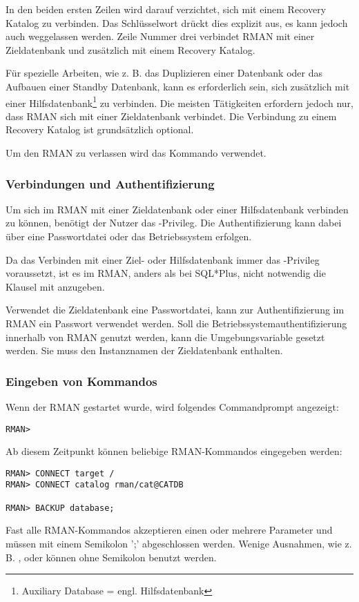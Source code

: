           In den beiden ersten Zeilen wird darauf verzichtet, sich mit einem Recovery Katalog zu verbinden. Das Schlüsselwort  drückt dies explizit aus, es kann jedoch auch weggelassen werden. Zeile Nummer drei verbindet RMAN mit einer Zieldatenbank und zusätzlich mit einem Recovery Katalog.

          Für spezielle Arbeiten, wie z. B. das Duplizieren einer Datenbank oder das Aufbauen einer Standby Datenbank, kann es erforderlich sein, sich zusätzlich mit einer Hilfsdatenbank\footnote{Auxiliary Database = engl. Hilfsdatenbank} zu verbinden. Die meisten Tätigkeiten erfordern jedoch nur, dass RMAN sich mit einer Zieldatenbank verbindet. Die Verbindung zu einem Recovery Katalog ist grundsätzlich optional.

          Um den RMAN zu verlassen wird das Kommando  verwendet.
\clearpage
        \subsubsection{Verbindungen und Authentifizierung}
          \begin{merke}
            Um sich im RMAN mit einer Zieldatenbank oder einer Hilfsdatenbank verbinden zu können, be\-nö\-tigt der Nutzer das -Privileg. Die Authentifizierung kann dabei über eine Passwortdatei oder das Betriebssystem erfolgen.
          \end{merke}
          Da das Verbinden mit einer Ziel- oder Hilfsdatenbank immer das -Privileg voraussetzt, ist es im RMAN, anders als bei SQL*Plus, nicht notwendig die Klausel  mit anzugeben.

          Verwendet die Zieldatenbank eine Passwortdatei, kann zur Authentifizierung im RMAN ein Passwort verwendet werden. Soll die Be\-triebs\-sys\-tem\-authen\-ti\-fi\-zie\-rung in\-ner\-halb von RMAN genutzt werden, kann die Umgebungsvariable  gesetzt werden. Sie muss den Instanznamen der Zieldatenbank enthalten.
        \subsubsection{Eingeben von Kommandos}
          Wenn der RMAN gestartet wurde, wird folgendes Commandprompt angezeigt:
          \begin{lstlisting}[caption={Das RMAN-Commandprompt},label=admin1002,language=rman]
RMAN>
          \end{lstlisting}
          Ab diesem Zeitpunkt können beliebige RMAN-Kommandos eingegeben werden:
          \begin{lstlisting}[caption={Beispiel für einige RMAN-Kommandos},label=admin1003,language=rman]
RMAN> CONNECT target /
RMAN> CONNECT catalog rman/cat@CATDB

RMAN> BACKUP database;
          \end{lstlisting}
          Fast alle RMAN-Kommandos akzeptieren einen oder mehrere Parameter und müssen mit einem Semikolon ';' abgeschlossen werden. Wenige Ausnahmen, wie z. B. ,  oder  können ohne Semikolon benutzt werden.

